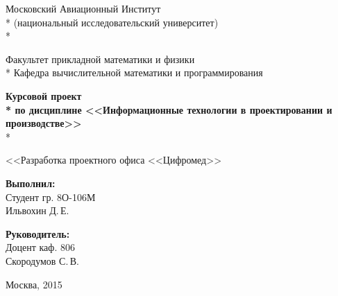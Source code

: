 \begin{titlepage}

\newpage

\begin{center}
Московский Авиационный Институт \\*
(национальный исследовательский университет) \\*

\vspace{2em}

Факультет прикладной математики и физики \\*
Кафедра вычислительной математики и программирования

\vspace{10em}

\Large \textbf{Курсовой проект \\*
по дисциплине <<Информационные технологии в проектировании и производстве>>} \\*

\vspace{3em}

<<Разработка проектного офиса <<Цифромед>>
\end{center}

\vspace{8em}

\begin{minipage}[b]{22em}
  {\bfseries Выполнил:} \\
  \indent Студент гр. 8О-106М \\
  \indent  Ильвохин Д.\,Е.
\end{minipage} \begin{minipage}[b]{10em}
  {\bfseries Руководитель:} \\
  \indent Доцент каф. 806 \\
  \indent Скородумов С.\,В.
\end{minipage}

\vspace{\fill}

\begin{center}
Москва, 2015
\end{center}

\end{titlepage}
